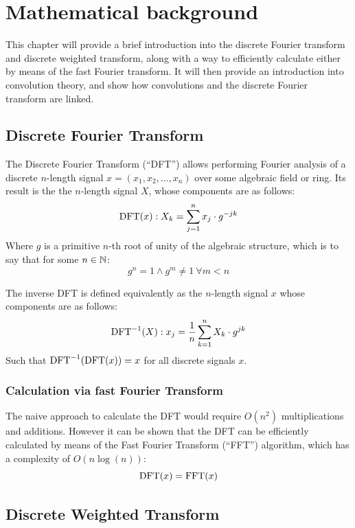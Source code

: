 \chapter{Mathematical background}
\label{chapter:mathematical_background}

This chapter will provide a brief introduction into the discrete Fourier
transform and discrete weighted transform, along with a way to efficiently
calculate either by means of the fast Fourier transform. It will then provide
an introduction into convolution theory, and show how convolutions and the
discrete Fourier transform are linked.

\section{Discrete Fourier Transform}

The Discrete Fourier Transform (``DFT'') allows performing Fourier analysis of
a discrete $n$-length signal $x = (x_1, x_2, \ldots, x_{n})$ over some
algebraic field or ring. Its result is the the $n$-length signal $X$, whose
components are as follows:\autocite{crandallPrimeNumbersComputational2005}
\[
		\operatorname{DFT}(x) : X_k = \sum_{j=1}^{n} x_j \cdot g^{-jk}
\]
Where $g$ is a primitive $n$-th root of unity of the algebraic structure, which
is to say that for some $n \in \mathbb{N}$:
\[
		g^n = 1 \land g^m \neq 1\ \forall m < n
\]

The inverse DFT is defined equivalently as the $n$-length signal $x$ whose
components are as follows:
\[
		\operatorname{DFT}^{-1}(X) : x_j = \frac{1}{n} \sum_{k=1}^{n} X_k \cdot g^{jk}
\]
Such that $\operatorname{DFT}^{-1}(\operatorname{DFT}(x)) = x$ for all discrete signals $x$.

\subsection{Calculation via fast Fourier Transform}

The naive approach to calculate the DFT would require $O(n^2)$ multiplications
and additions. However it can be shown that the DFT can be efficiently
calculated by means of the Fast Fourier Transform (``FFT'') algorithm, which
has a complexity of $O(n \log(n))$:\autocite{crandallPrimeNumbersComputational2005}
\[
		\operatorname{DFT}(x) = \operatorname{FFT}(x)
\]

\section{Discrete Weighted Transform}

